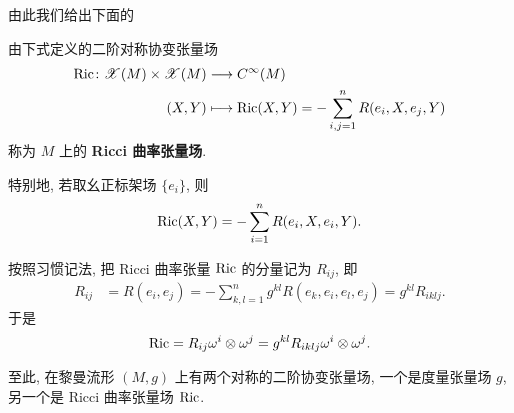 由此我们给出下面的
\begin{definition}
  由下式定义的二阶对称协变张量场
  \begin{align*}
    \operatorname{Ric}\colon\mathscr{X}(M)\times\mathscr{X}(M)
    & \longrightarrow C^{\infty}(M) \\
    (X,Y) & \longmapsto \operatorname{Ric}(X,Y) = -\sum_{i,j=1}^n R(e_i,X,e_j,Y)
  \end{align*}
  称为 $M$ 上的 \textbf{Ricci 曲率张量场}. 
 
  特别地, 若取幺正标架场 $\{e_i\}$, 则
  \[\operatorname{Ric}(X,Y) = -\sum_{i=1}^n R(e_i,X,e_i,Y).\]
\end{definition}

按照习惯记法, 把 Ricci 曲率张量 $\operatorname{Ric}$ 的分量记为 $R_{ij}$, 即
\begin{align*}
  R_{ij}
  & = R(e_i,e_j) = -\sum_{k,l=1}^n g^{kl}R(e_k,e_i,e_l,e_j) = g^{kl}R_{iklj}.
\end{align*}
于是
\[\operatorname{Ric} = R_{ij}\omega^i\otimes\omega^j = g^{kl}R_{iklj}\omega^i\otimes\omega^j.\]

至此, 在黎曼流形 $(M,g)$ 上有两个对称的二阶协变张量场,
一个是度量张量场 $g$, 另一个是 Ricci 曲率张量场 $\operatorname{Ric}$.